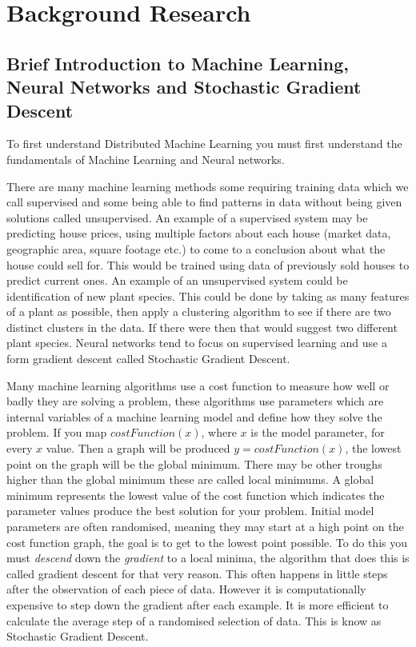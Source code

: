 \clearpage
\section{Background Research}
\subsection{Brief Introduction to Machine Learning, Neural Networks and Stochastic Gradient Descent}
To first understand Distributed Machine Learning you must first understand the
fundamentals of Machine Learning and Neural networks. 

There are many machine learning methods some requiring training data which we
call supervised and some being able to find patterns in data without being given
solutions called unsupervised. \cite{alpaydin2020introduction} An example of
a supervised system may be predicting house prices, using multiple factors
about each house (market data, geographic area, square footage etc.) to come to
a conclusion about what the house could sell for. This would be trained using
data of previously sold houses to predict current ones. An example of an
unsupervised system could be identification of new plant species. This could be
done by taking as many features of a plant as possible, then apply a clustering
algorithm to see if there are two distinct clusters in the data. If there were
then that would suggest two different plant species. Neural networks tend to
focus on supervised learning and use a form gradient descent called Stochastic
Gradient Descent.

Many machine learning algorithms use a cost function to measure how well or
badly they are solving a problem, these algorithms use parameters which are
internal variables of a machine learning model and define how they solve the
problem. If you map \(costFunction(x)\), where \(x\) is the model parameter, for
every \(x\) value. Then a graph will be produced \(y = costFunction(x)\), the
lowest point on the graph will be the global minimum. There may be other troughs
higher than the global minimum these are called local minimums. A global minimum
represents the lowest value of the cost function which indicates the parameter
values produce the best solution for your problem. Initial model parameters are
often randomised, meaning they may start at a high point on the cost function
graph, the goal is to get to the lowest point possible. To do this you must
\textit{descend} down the \textit{gradient} to a local minima, the algorithm
that does this is called gradient descent for that very reason. This often
happens in little steps after the observation of each piece of data. However it
is computationally expensive to step down the gradient after each example. It is
more efficient to calculate the average step of a randomised selection of data.
This is know as Stochastic Gradient Descent.

